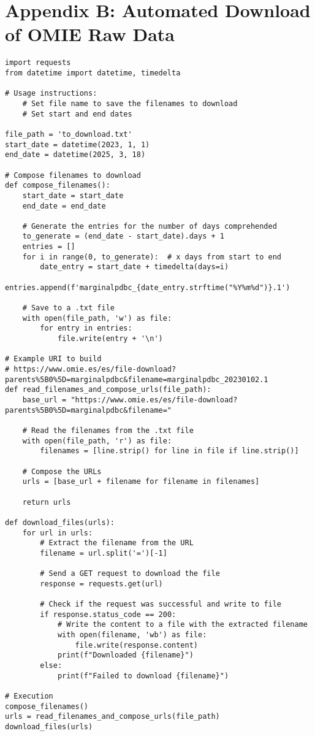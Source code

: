 \documentclass[12pt]{report} %
\begin{document}
\chapter* {Appendix B: Automated Download of OMIE Raw Data}
\label{app:appendix_b_data_scrapping}

\begin{lstlisting}
import requests
from datetime import datetime, timedelta

# Usage instructions:
    # Set file name to save the filenames to download
    # Set start and end dates

file_path = 'to_download.txt'
start_date = datetime(2023, 1, 1)
end_date = datetime(2025, 3, 18)

# Compose filenames to download
def compose_filenames():
    start_date = start_date
    end_date = end_date
    
    # Generate the entries for the number of days comprehended
    to_generate = (end_date - start_date).days + 1
    entries = []
    for i in range(0, to_generate):  # x days from start to end
        date_entry = start_date + timedelta(days=i)
        entries.append(f'marginalpdbc_{date_entry.strftime("%Y%m%d")}.1')
    
    # Save to a .txt file
    with open(file_path, 'w') as file:
        for entry in entries:
            file.write(entry + '\n')

# Example URI to build
# https://www.omie.es/es/file-download?parents%5B0%5D=marginalpdbc&filename=marginalpdbc_20230102.1
def read_filenames_and_compose_urls(file_path):
    base_url = "https://www.omie.es/es/file-download?parents%5B0%5D=marginalpdbc&filename="
    
    # Read the filenames from the .txt file
    with open(file_path, 'r') as file:
        filenames = [line.strip() for line in file if line.strip()]
    
    # Compose the URLs
    urls = [base_url + filename for filename in filenames]
    
    return urls

def download_files(urls):
    for url in urls:
        # Extract the filename from the URL
        filename = url.split('=')[-1]
        
        # Send a GET request to download the file
        response = requests.get(url)
        
        # Check if the request was successful and write to file
        if response.status_code == 200:
            # Write the content to a file with the extracted filename
            with open(filename, 'wb') as file:
                file.write(response.content)
            print(f"Downloaded {filename}")
        else:
            print(f"Failed to download {filename}")

# Execution
compose_filenames()
urls = read_filenames_and_compose_urls(file_path)
download_files(urls)
\end{lstlisting}
\end{document}

